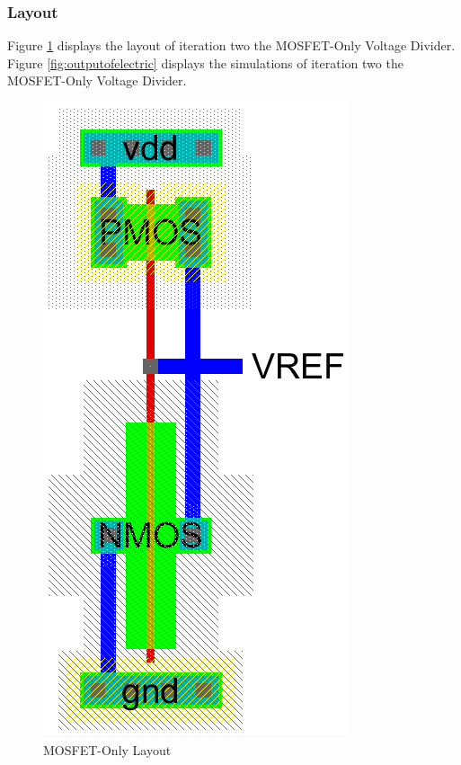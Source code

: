 \documentclass[conference]{IEEEtran}
\begin{document}
\subsubsection{Layout}
Figure \ref{fig:mosfet-electric-2} displays the layout of iteration two the MOSFET-Only Voltage Divider.  Figure \ref{fig:outputofelectric} displays the simulations of iteration two the MOSFET-Only Voltage Divider.
\begin{figure}[!htbp]
  \centering
  \includegraphics[scale=0.35]{images/mosfet-electric-2.png}
  \caption[mosfet-electric-2]{MOSFET-Only Layout}
  \label{fig:mosfet-electric-2}
\end{figure}

\end{document}
